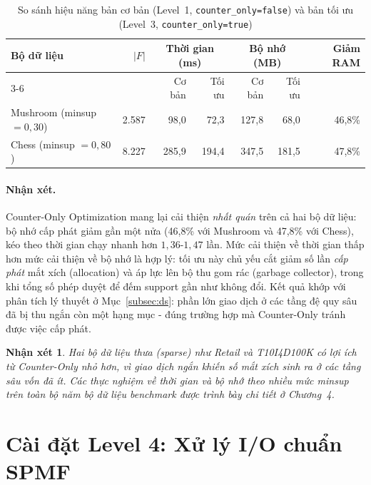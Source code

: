 \documentclass[12pt,a4paper]{report}
\newtheorem{remark}{Nhận xét}[chapter]
\begin{document}
\begin{table}[H]
    \centering
    \caption{So sánh hiệu năng bản cơ bản (Level~1, \texttt{counter\_only=false})
             và bản tối ưu (Level~3, \texttt{counter\_only=true})}
    \label{tab:opt}
    \begin{tabularx}{\textwidth}{|X|r|r|r|r|r|r|}
        \hline
        \multirow{2}{*}{\textbf{Bộ dữ liệu}} & \multirow{2}{*}{\textbf{$|F|$}}
            & \multicolumn{2}{c|}{\textbf{Thời gian (ms)}}
            & \multicolumn{2}{c|}{\textbf{Bộ nhớ (MB)}}
            & \multirow{2}{*}{\textbf{Giảm RAM}} \\
        \cline{3-6}
            & & Cơ bản & Tối ưu & Cơ bản & Tối ưu & \\
        \hline
        Mushroom (minsup $=0{,}30$) & 2.587 & 98{,}0  & 72{,}3  & 127{,}8 & 68{,}0  & 46{,}8\% \\
        \hline
        Chess (minsup $=0{,}80$)    & 8.227 & 285{,}9 & 194{,}4 & 347{,}5 & 181{,}5 & 47{,}8\% \\
        \hline
    \end{tabularx}
\end{table}

\paragraph{Nhận xét.}
Counter-Only Optimization mang lại cải thiện \emph{nhất quán} trên cả hai bộ dữ
liệu: bộ nhớ cấp phát giảm gần một nửa (46,8\% với Mushroom và 47,8\% với Chess),
kéo theo thời gian chạy nhanh hơn $1{,}36$-$1{,}47$ lần. Mức cải thiện về thời
gian thấp hơn mức cải thiện về bộ nhớ là hợp lý: tối ưu này chủ yếu cắt giảm số
lần \emph{cấp phát} mắt xích (allocation) và áp lực lên bộ thu gom rác (garbage
collector), trong khi tổng số phép duyệt để đếm support gần như không đổi. Kết
quả khớp với phân tích lý thuyết ở Mục~\ref{subsec:ds}: phần lớn giao dịch ở các
tầng đệ quy sâu đã bị thu ngắn còn một hạng mục - đúng trường hợp mà Counter-Only
tránh được việc cấp phát.

\begin{remark}
Hai bộ dữ liệu thưa (sparse) như Retail và T10I4D100K có lợi ích từ Counter-Only
nhỏ hơn, vì giao dịch ngắn khiến số mắt xích sinh ra ở các tầng sâu vốn đã ít.
Các thực nghiệm về thời gian và bộ nhớ theo nhiều mức minsup trên toàn bộ năm bộ
dữ liệu benchmark được trình bày chi tiết ở Chương~4.
\end{remark}


\section{Cài đặt Level 4: Xử lý I/O chuẩn SPMF}
\end{document}
